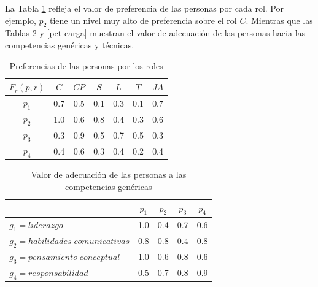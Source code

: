 %
La Tabla \ref{pr-carga} refleja el valor de preferencia de las personas por cada rol. Por ejemplo, $p_2$  tiene un nivel muy alto de preferencia sobre el rol  $C$. Mientras que las Tablas \ref{pcg-carga} y \ref{pct-carga} muestran el valor de adecuación de las personas hacia las competencias genéricas y técnicas.

\begin{table}[H]
	\centering
	\caption{Preferencias de las personas por los roles}\label{pr-carga}
	\begin{tabular}{|c|c|c|c|c|c|c|}
		\hline
		$F_r(p,r)$  & $C$ & $CP$ & $S$ & $L$ & $T$  & $JA$ \\ \hline
		$p_1$   	& 0.7 &  0.5 & 0.1 & 0.3 &  0.1 &  0.7 \\ \hline
		$p_2$   	& 1.0 &  0.6 & 0.8 & 0.4 &  0.3 &  0.6  \\ \hline
		$p_3$  	 	& 0.3 &  0.9 & 0.5 & 0.7 &  0.5 &  0.3  \\ \hline
		$p_4$    	& 0.4 &  0.6 & 0.3 & 0.4 &  0.2 &  0.4  \\ \hline
	\end{tabular}
\end{table}

\begin{table}[H]
	\centering
	\caption{Valor de adecuación de las personas a las competencias genéricas}\label{pcg-carga}
	\begin{tabular}{|l|c|c|c|c|}
		\hline
		\thead{$F_g(p,g)$} & $p_1$ & $p_2$ & $p_3$ & $p_4$ \\ \hline
		$g_1=liderazgo$  	   &  1.0  &  0.4  &  0.7 & 0.6 \\ \hline
		$g_2=habilidades\;comunicativas$      &  0.8  &  0.8  &  0.4 & 0.8 \\ \hline
		$g_3=pensamiento\;conceptual$  	   &  1.0  &  0.6  &  0.8 & 0.6 \\ \hline
		$g_4=responsabilidad$  	   &  0.5  &  0.7  &  0.8 & 0.9 \\ \hline
	\end{tabular}
\end{table}

